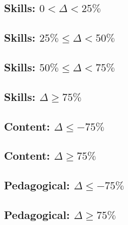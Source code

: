 \documentclass{article}
\begin{document}


\subsection{Skills: $0 < \Delta < 25\%$}



\subsection{Skills: $25\% \leq \Delta < 50\%$}



\subsection{Skills: $50\% \leq \Delta < 75\%$}



\subsection{Skills: $\Delta \geq 75\%$}



\subsection{Content: $\Delta \leq -75\%$}



\subsection{Content: $\Delta \geq 75\%$}



\subsection{Pedagogical: $\Delta \leq -75\%$}



\subsection{Pedagogical: $\Delta \geq 75\%$}


\end{document}
